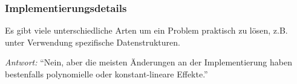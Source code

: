 \documentclass[aspectratio=1610,onlymath]{beamer}
\begin{document}
\begin{frame}\frametitle{Implementierungsdetails}

Es gibt viele unterschiedliche Arten um ein Problem praktisch zu lösen,
z.B. unter Verwendung spezifische Datenstrukturen.\\\smallskip

\pause\bigskip

\emph{Antwort:} "`Nein, aber die meisten Änderungen an der Implementierung haben bestenfalls polynomielle oder konstant-lineare Effekte."'\bigskip



\end{frame}
\end{document}
